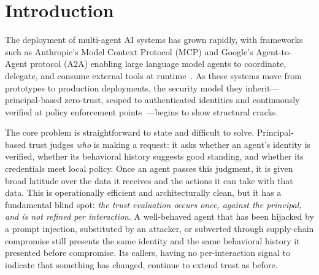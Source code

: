 \documentclass[sigconf,nonacm]{acmart}
\begin{document}
\maketitle

\section{Introduction}
\label{sec:intro}


The deployment of multi-agent AI systems has grown rapidly, with frameworks such as Anthropic's Model Context Protocol (MCP) and Google's Agent-to-Agent protocol (A2A) enabling large language model agents to coordinate, delegate, and consume external tools at runtime~\cite{REF:mcp,REF:a2a}. As these systems move from prototypes to production deployments, the security model they inherit---principal-based zero-trust, scoped to authenticated identities and continuously verified at policy enforcement points~\cite{REF:nist-zta}---begins to show structural cracks.

The core problem is straightforward to state and difficult to solve. Principal-based trust judges \emph{who} is making a request: it asks whether an agent's identity is verified, whether its behavioral history suggests good standing, and whether its credentials meet local policy. Once an agent passes this judgment, it is given broad latitude over the data it receives and the actions it can take with that data. This is operationally efficient and architecturally clean, but it has a fundamental blind spot: \emph{the trust evaluation occurs once, against the principal, and is not refined per interaction}. A well-behaved agent that has been hijacked by a prompt injection, substituted by an attacker, or subverted through supply-chain compromise still presents the same identity and the same behavioral history it presented before compromise. Its callers, having no per-interaction signal to indicate that something has changed, continue to extend trust as before.

\end{document}
